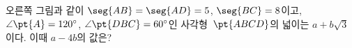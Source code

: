 \noindent\begin{minipage}[t]{0.58\linewidth}\vspace{0pt}\raggedright 오른쪽 그림과 같이 $\seg{AB}=\seg{AD}=5$, $\seg{BC}=8$이고, $\angle\pt{A}=120^\circ$, $\angle\pt{DBC}=60^\circ$인 사각형~$\pt{ABCD}$의 넓이는 $a+b\sqrt{3}$이다. 이때 $a-4b$의 값은? \end{minipage}\hfill\begin{minipage}[t]{0.4\linewidth}\vspace{0pt}\centering \resizebox{\ifdim\width>\linewidth\linewidth\else\width\fi}{!}{}\end{minipage}\par
{}
